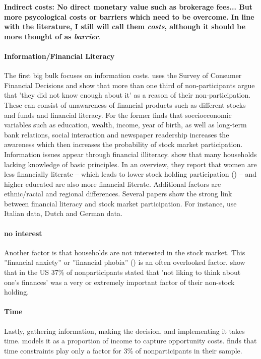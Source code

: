 \documentclass[ProjectABM]{subfiles}
\begin{document}
\textbf{Indirect costs: No direct monetary value such as brokerage fees... But more psycological costs or barriers which need to be overcome. In line with the literature, I still will call them \textit{costs}, although it should be more thought of as \textit{barrier}}.

\paragraph{Information/Financial Literacy}
The first big bulk focuses on information costs. \cite{king_leape_1987asset} uses the Survey of Consumer Financial Decisions and show that more than one third of non-participants argue that 'they did not know enough about it' as a reason of their non-participation. These can consist of unawareness of financial products such as different stocks and funds and financial literacy. For the former \cite{guiso_jappelli_2005} finds that soecioeconomic variables such as education, wealth, income, year of birth, as well as long-term bank relations, social interaction and newspaper readership increases the awareness which then increases the probability of stock market participation. Information issues appear through financial illiteracy. \cite{lusardi_mitchell_2011financial_literacy} show that many households lacking knowledge of basic principles. In an overview, they report that women are less financially literate -- which leads to lower stock holding participation (\cite{almenberg_2015gender}) -- and higher educated are also more financial literate. Additional factors are ethnic/racial and regional differences. Several papers show the strong link between financial literacy and stock market participation. For instance, \cite{guiso_japelli_2002household_book} use Italian data, \cite{hochguertel_et_al_2002household,vanrooij_et_al_2011} Dutch and \cite{borsch_eymann_2000household} German data.

\paragraph{no interest}
Another factor is that households are not interested in the stock market. This ''financial anxiety'' or ''financial phobia'' (\cite{shapiro_burchell_2012}) is an often overlooked factor. \cite{choi_2020} show that in the US 37\% of nonparticipants stated that 'not liking to think about one's finances' was a very or extremely important factor of their non-stock holding.

\paragraph{Time}
Lastly, gathering information, making the decision, and implementing it takes time. \cite{bonaparte_et_al_2012adjustment} models it as a proportion of income to capture opportunity costs. \cite{choi_2020} finds that time constraints play only a factor for 3\% of nonparticipants in their sample. %
\end{document}
